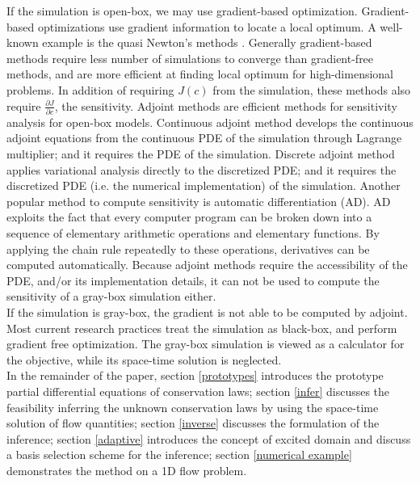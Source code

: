 \documentclass[a4paper,onecolumn]{article}
\theoremstyle{remark}
\begin{document}
\noindent If the simulation is open-box, we may use gradient-based optimization.
Gradient-based optimizations use gradient information to locate a local optimum.
A well-known example is the quasi Newton's methods \cite{quasiNewton}. 
Generally gradient-based methods require less number of simulations 
to converge than gradient-free methods, and are more efficient at finding local optimum for high-dimensional problems.
In addition of requiring $J(c)$ from the simulation,
these methods also require $\frac{\partial J}{\partial c}$, the sensitivity.
Adjoint methods are efficient methods for sensitivity analysis\cite{cont discretize adjoint}
for open-box models.
Continuous adjoint method develops the continuous adjoint equations from the continuous PDE of the simulation through 
Lagrange multiplier; and it requires the PDE of the simulation. 
Discrete adjoint method applies variational analysis directly to the discretized PDE; and it requires the
discretized PDE (i.e. the numerical implementation) of the simulation.
Another popular method to compute sensitivity is automatic differentiation (AD)\cite{automaticdiff}.
AD exploits the fact that every computer program can be broken down into a sequence of elementary arithmetic operations
and elementary functions. By applying the chain rule repeatedly to these operations, 
derivatives can be computed automatically. Because adjoint methods require
the accessibility of the PDE, and/or its implementation details, 
it can not be used to compute the sensitivity of a gray-box simulation either.\\

\noindent If the simulation is gray-box, the gradient is not able to be computed by adjoint. 
Most current research practices treat the simulation as
black-box, and perform gradient free optimization. The gray-box simulation is viewed
as a calculator for the objective, while its space-time solution is neglected.\\

\noindent In the remainder of the paper, section \ref{prototypes} introduces the prototype
partial differential equations of conservation laws; section \ref{infer} discusses the feasibility
inferring the unknown conservation laws by using the space-time solution of flow quantities;
section \ref{inverse} discusses the formulation of the inference; section \ref{adaptive}
introduces the concept of excited domain and discuss a basis selection scheme for the inference;
section \ref{numerical example} demonstrates the method on a 1D flow problem.
\end{document}
